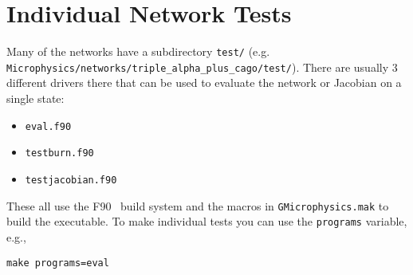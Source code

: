 \section{Individual Network Tests}

Many of the networks have a subdirectory {\tt test/} (e.g. {\tt
  Microphysics/networks/triple\_alpha\_plus\_cago/test/}).  There are
usually 3 different drivers there that can be used to evaluate the
network or Jacobian on a single state:
\begin{itemize}
  \item {\tt eval.f90}

  \item {\tt testburn.f90}

  \item {\tt testjacobian.f90}
\end{itemize}
These all use the F90 \boxlib\ build system and the macros in 
{\tt GMicrophysics.mak} to build the executable.  To make 
individual tests you can use the {\tt programs} variable, e.g.,
\begin{verbatim}
make programs=eval
\end{verbatim}
